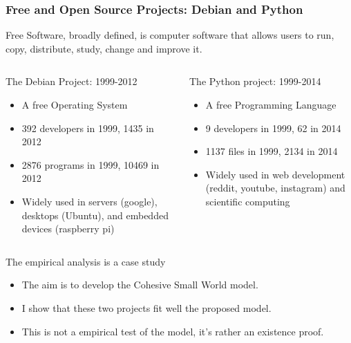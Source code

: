 \documentclass[ignorenonframetext,red,8pt,notes=hide]{beamer}
\begin{document}
\begin{frame}
\frametitle{Free and Open Source Projects: Debian and Python}

Free Software, broadly defined, is computer software that allows users to run, copy, distribute, study, change and improve it.

\begin{columns}[c]
\begin{column}{0.5\textwidth}
\begin{block}{The Debian Project: 1999-2012}
\begin{itemize}
\item A free Operating System
\item 392 developers in 1999, 1435 in 2012 
\item 2876 programs in 1999, 10469 in 2012
\item Widely used in servers (google), desktops (Ubuntu), and embedded devices (raspberry pi)
\end{itemize}
\end{block}
\end{column}

\begin{column}{0.5\textwidth}
\begin{block}{The Python project: 1999-2014}
\begin{itemize}
\item A free Programming Language
\item 9 developers in 1999, 62 in 2014
\item 1137 files in 1999, 2134 in 2014 
\item Widely used in web development (reddit, youtube, instagram) and scientific computing
\end{itemize}
\end{block}
\end{column}
\end{columns}

\pause

\begin{block}{The empirical analysis is a case study}
\begin{itemize}
\item The aim is to develop the Cohesive Small World model.
\item I show that these two projects fit well the proposed model.
\item This is not a empirical test of the model, it's rather an existence proof. 
\end{itemize}
\end{block}

\end{frame}
\end{document}

